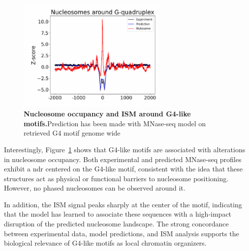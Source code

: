 \documentclass[11pt]{book}
\begin{document}
\begin{figure}[htbp]
    \centering
    \includegraphics[width=0.65\textwidth]{Figures/Results/gquad_meta.pdf}
    \caption{\textbf{Nucleosome occupancy and ISM around G4-like motifs.}Prediction has been made with MNase-seq model on retrieved G4 motif genome wide}
    \label{fig:gquad_meta}
\end{figure}

Interestingly, Figure~\ref{fig:gquad_meta} shows that G4-like motifs are associated with alterations in nucleosome occupancy. Both experimental and predicted MNase-seq profiles exhibit a \gls{ndr} centered on the G4-like motif, consistent with the idea that these structures act as physical or functional barriers to nucleosome positioning. However, no phased nucleosomes can be observed around it.

In addition, the ISM signal peaks sharply at the center of the motif, indicating that the model has learned to associate these sequences with a high-impact disruption of the predicted nucleosome landscape. The strong concordance between experimental data, model predictions, and ISM analysis supports the biological relevance of G4-like motifs as local chromatin organizers.
\end{document}
